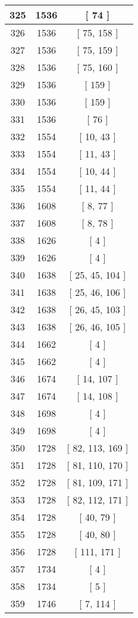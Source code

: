\begin{center}
\begin{longtable}[H]{|| c c c ||}
325 & 1536 & [ 74 ] \\ 
\hline
326 & 1536 & [ 75, 158 ] \\ 
\hline
327 & 1536 & [ 75, 159 ] \\ 
\hline
328 & 1536 & [ 75, 160 ] \\ 
\hline
329 & 1536 & [ 159 ] \\ 
\hline
330 & 1536 & [ 159 ] \\ 
\hline
331 & 1536 & [ 76 ] \\ 
\hline
332 & 1554 & [ 10, 43 ] \\ 
\hline
333 & 1554 & [ 11, 43 ] \\ 
\hline
334 & 1554 & [ 10, 44 ] \\ 
\hline
335 & 1554 & [ 11, 44 ] \\ 
\hline
336 & 1608 & [ 8, 77 ] \\ 
\hline
337 & 1608 & [ 8, 78 ] \\ 
\hline
338 & 1626 & [ 4 ] \\ 
\hline
339 & 1626 & [ 4 ] \\ 
\hline
340 & 1638 & [ 25, 45, 104 ] \\ 
\hline
341 & 1638 & [ 25, 46, 106 ] \\ 
\hline
342 & 1638 & [ 26, 45, 103 ] \\ 
\hline
343 & 1638 & [ 26, 46, 105 ] \\ 
\hline
344 & 1662 & [ 4 ] \\ 
\hline
345 & 1662 & [ 4 ] \\ 
\hline
346 & 1674 & [ 14, 107 ] \\ 
\hline
347 & 1674 & [ 14, 108 ] \\ 
\hline
348 & 1698 & [ 4 ] \\ 
\hline
349 & 1698 & [ 4 ] \\ 
\hline
350 & 1728 & [ 82, 113, 169 ] \\ 
\hline
351 & 1728 & [ 81, 110, 170 ] \\ 
\hline
352 & 1728 & [ 81, 109, 171 ] \\ 
\hline
353 & 1728 & [ 82, 112, 171 ] \\ 
\hline
354 & 1728 & [ 40, 79 ] \\ 
\hline
355 & 1728 & [ 40, 80 ] \\ 
\hline
356 & 1728 & [ 111, 171 ] \\ 
\hline
357 & 1734 & [ 4 ] \\ 
\hline
358 & 1734 & [ 5 ] \\ 
\hline
359 & 1746 & [ 7, 114 ] \\ 

\end{longtable}
\end{center}
